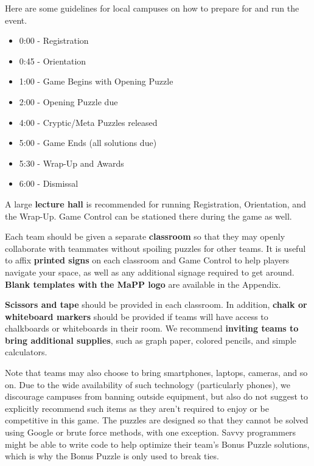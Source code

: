 
Here are some guidelines for local campuses on how to prepare for and
run the event.

\small

\begin{itemize}
  \item 0:00 - Registration
  \item 0:45 - Orientation
  \item 1:00 - Game Begins with Opening Puzzle
  \item 2:00 - Opening Puzzle due
  \item 4:00 - Cryptic/Meta Puzzles released
  \item 5:00 - Game Ends (all solutions due)
  \item 5:30 - Wrap-Up and Awards
  \item 6:00 - Dismissal
\end{itemize}


A large \textbf{lecture hall} is recommended for running Registration,
Orientation, and the Wrap-Up. Game Control can be stationed there during
the game as well.

Each team should be given a separate \textbf{classroom} so that they may
openly collaborate with teammates without spoiling puzzles for other teams.
It is useful to affix \textbf{printed signs} on each classroom and Game
Control to help players navigate your space, as well as any additional
signage required to get around. \textbf{Blank templates with the MaPP logo}
are available in the Appendix.


\textbf{Scissors and tape} should be provided in each classroom.
In addition, \textbf{chalk or whiteboard markers} should be provided if
teams will have access to chalkboards or whiteboards in their room.
We recommend \textbf{inviting teams to bring additional supplies}, such as
graph paper, colored pencils, and simple calculators.

Note that teams may also choose to bring smartphones, laptops, cameras,
and so on. Due to the wide availability of such technology (particularly
phones), we discourage campuses from banning outside equipment, but also
do not suggest to explicitly recommend such items as they aren't required
to enjoy or be competitive in this game. The puzzles are
designed so that they cannot be solved using Google or brute force methods,
with one exception. Savvy programmers might be able to write code to
help optimize their team's Bonus Puzzle solutions, which is why the Bonus
Puzzle is only used to break ties.

